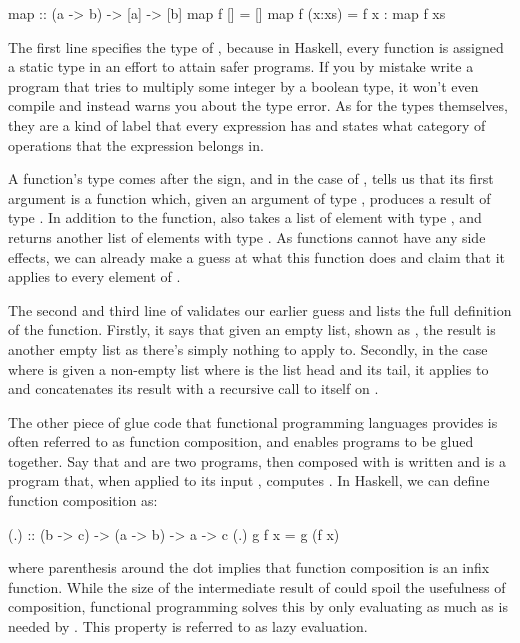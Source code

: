 \begin{code}
map :: (a -> b) -> [a] -> [b]
map f []     = []
map f (x:xs) = f x : map f xs
\end{code}

The first line specifies the type of , because in Haskell, every function is assigned a static type in an effort to attain safer programs. If you by mistake write a program that tries to multiply some integer by a boolean type, it won't even compile and instead warns you about the type error. As for the types themselves, they are a kind of label that every expression has and states what category of operations that the expression belongs in.

A function's type comes after the \codei{::} sign, and in the case of , tells us that its first argument is a function  which, given an argument of type , produces a result of type . In addition to the function,  also takes a list  of element with type , and returns another list of elements with type . As functions cannot have any side effects, we can already make a guess at what this function does and claim that it applies  to every element of .

The second and third line of  validates our earlier guess and lists the full definition of the function. Firstly, it says that given an empty list, shown as \codei{[]}, the result is another empty list as there's simply nothing to apply  to. Secondly, in the case where  is given a non-empty list  where  is the list head and  its tail, it applies  to  and concatenates its result with a recursive call to itself on .

The other piece of glue code that functional programming languages provides is often referred to as function composition, and enables programs to be glued together. Say that  and  are two programs, then  composed with  is written  and is a program that, when applied to its input , computes . In Haskell, we can define function composition as:

\begin{code}
(.) :: (b -> c) -> (a -> b) -> a -> c
(.) g f x = g (f x)
\end{code}

\noindent where parenthesis around the dot implies that function composition is an infix function. While the size of the intermediate result of  could spoil the usefulness of composition, functional programming solves this by only evaluating  as much as is needed by . This property is referred to as lazy evaluation.

